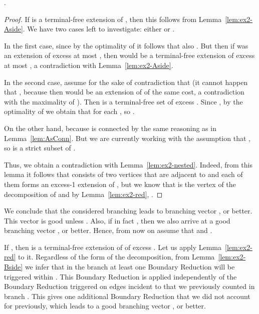 \begin{myclaim}\label{cl:even-if-terminal1}
.
\end{myclaim}
\begin{proof}
If  is a terminal-free extension of , then this follows from Lemma~\ref{lem:ex2-Aside}. We have two cases left to investigate: either  or .

In the first case, since  by the optimality of  it follows that also . But then if  was an extension of excess at most , then  would be a terminal-free extension of excess at most , a contradiction with Lemma~\ref{lem:ex2-Aside}.

In the second case, assume for the sake of contradiction that  (it cannot happen that , because then  would be an extension of  of the same cost, a contradiction with the maximality of ). Then  is a terminal-free set of excess . Since , by the optimality of  we obtain that  for each , so . 

On the other hand,  because  is connected by the same reasoning as in Lemma~\ref{lem:AsConn}. But we are currently working with the assumption that , so  is a strict subset of . 

Thus, we obtain a contradiction with Lemma~\ref{lem:ex2-nested}. Indeed, from this lemma it follows that  consists of two vertices that are adjacent to  and each of them forms an excess-1 extension of , but we know that  is the vertex  of the decomposition of  and by Lemma~\ref{lem:ex2-red}, .
\end{proof}

We conclude that the considered branching leads to branching vector , or better. This vector is good unless . Also, if in fact , then we also arrive at a good branching vector , or better. Hence, from now on assume that  and .

If , then  is a terminal-free extension of  of excess . Let us apply Lemma~\ref{lem:ex2-red} to it. Regardless of the form of the decomposition, from Lemma~\ref{lem:ex2-Bside} we infer that in the branch  at least one Boundary Reduction will be triggered within . This Boundary Reduction is applied independently of the Boundary Reduction triggered on edges incident to  that we previously counted in branch . This gives one additional Boundary Reduction that we did not account for previously, which leads to a good branching vector , or better.









